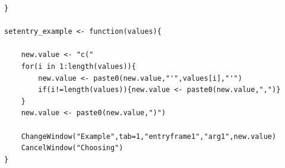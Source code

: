 \documentclass[a4paper]{article}\usepackage[]{graphicx}\usepackage[]{color}
\begin{document}
\begin{verbatim}
}

setentry_example <- function(values){
	
	new.value <- "c("
	for(i in 1:length(values)){
		new.value <- paste0(new.value,"'",values[i],"'")
		if(i!=length(values)){new.value <- paste0(new.value,",")}
	}
	new.value <- paste0(new.value,")")
	
	ChangeWindow("Example",tab=1,"entryframe1","arg1",new.value)
	CancelWindow("Choosing")
}


\end{verbatim}
\end{document}
